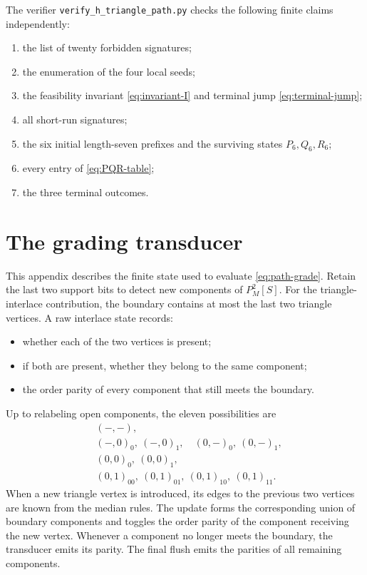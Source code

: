 \documentclass[10pt,letterpaper]{article}
\newcommand{\code}[1]{\nolinkurl{#1}}
\begin{document}
The verifier \code{verify_h_triangle_path.py} checks the following finite claims independently:
\begin{enumerate}
\item the list of twenty forbidden signatures;
\item the enumeration of the four local seeds;
\item the feasibility invariant \eqref{eq:invariant-I} and terminal jump \eqref{eq:terminal-jump};
\item all short-run signatures;
\item the six initial length-seven prefixes and the surviving states \(P_6,Q_6,R_6\);
\item every entry of \eqref{eq:PQR-table};
\item the three terminal outcomes.
\end{enumerate}

\section{The grading transducer}\label{app:grade-transducer}

This appendix describes the finite state used to evaluate \eqref{eq:path-grade}.  Retain the last two support bits to detect new components of \(P_M^2[S]\).  For the triangle-interlace contribution, the boundary contains at most the last two triangle vertices.  A raw interlace state records:
\begin{itemize}
\item whether each of the two vertices is present;
\item if both are present, whether they belong to the same component;
\item the order parity of every component that still meets the boundary.
\end{itemize}
Up to relabeling open components, the eleven possibilities are
\begin{align*}
&(-,-),\\
&(-,0)_0,\ (-,0)_1,\quad(0,-)_0,\ (0,-)_1,\\
&(0,0)_0,\ (0,0)_1,\\
&(0,1)_{00},\ (0,1)_{01},\ (0,1)_{10},\ (0,1)_{11}.
\end{align*}
When a new triangle vertex is introduced, its edges to the previous two vertices are known from the median rules.  The update forms the corresponding union of boundary components and toggles the order parity of the component receiving the new vertex.  Whenever a component no longer meets the boundary, the transducer emits its parity.  The final flush emits the parities of all remaining components.
\end{document}

